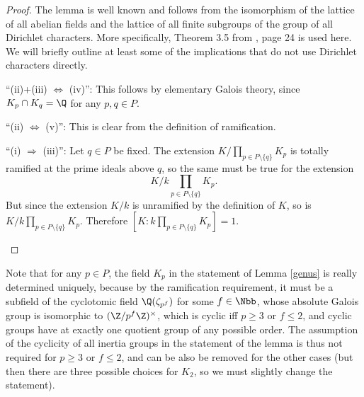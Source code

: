 \begin{proof}
The lemma %
is well known and follows from the isomorphism of the lattice of all abelian fields and the lattice of all finite subgroups of the group of all Dirichlet characters. More specifically, Theorem 3.5 from \citep{washington1997}, page 24 %
is used here. We will briefly outline at least some of the implications that do not use Dirichlet characters directly.

\begin{DESCRIPTION}%
\item[\enquote{(ii)+(iii) $\Leftrightarrow$ (iv)}:] This follows by elementary Galois theory, since $K_p\cap K_q=\Q$ for any $p,q\in P$.
\item[\enquote{(ii) $\Leftrightarrow$ (v)}:] This is clear from the definition of ramification.
\item[\enquote{(i) $\Rightarrow$ (iii)}:] Let $q\in P$ be fixed.
The extension $K/\prod_{p\in P\setminus\{q\}}K_p$ is totally ramified at the prime ideals above $q$, so the same must be true for the extension $$K/k\prod_{p\in P\setminus\{q\}}K_p.$$ But since the extension $K/k$ is unramified by the definition of $K$, so is $K/k\prod_{p\in P\setminus\{q\}}K_p$. Therefore $[K:k\prod_{p\in P\setminus\{q\}}K_p]=1$.
\begin{center}
\end{center}
\end{DESCRIPTION}
\end{proof}

\begin{rem}
Note that for any $p\in P$, the field $K_p$ in the statement of Lemma \ref{genus} is really determined uniquely, because
 by the ramification requirement, it must be a subfield of the cyclotomic field $\Q(\zeta_{p^f})$ for some $f\in\Nbb$, whose absolute Galois group is isomorphic to $(\Z/p^f\Z)^{\times}$, which is cyclic iff $p\geq 3$ or $f\leq 2$, and cyclic groups have at exactly one quotient group of any possible order. The assumption of the cyclicity of all inertia groups in the statement of the lemma is thus not required for $p\geq 3$ or $f\leq 2$, and can be also be removed for the other cases (but then there are three possible choices for $K_2$, so we must slightly change the statement).
\end{rem}


